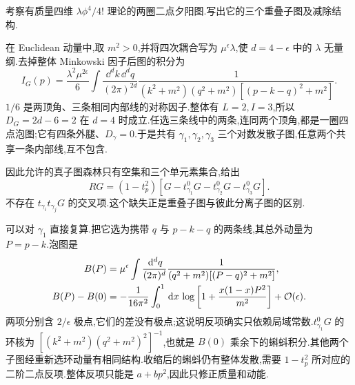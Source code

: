 \begin{example}
考察有质量四维 $\lambda\phi^4/4!$ 理论的两圈二点夕阳图.写出它的三个重叠子图及减除结构.
\end{example}
\begin{solution}
在 Euclidean 动量中,取 $m^2>0$,并将四次耦合写为 $\mu^\epsilon\lambda$,使 $d=4-\epsilon$ 中的 $\lambda$ 无量纲.去掉整体 Minkowski 因子后图的积分为
\begin{equation}
 I_G(p)=\frac{\lambda^2\mu^{2\epsilon}}{6}\int\frac{\dd^dk\,\dd^dq}{(2\pi)^{2d}}
 \frac1{(k^2+m^2)(q^2+m^2)[(p-k-q)^2+m^2]}.
 \label{eq:sunset-two-loop-integral}
\end{equation}
$1/6$ 是两顶角、三条相同内部线的对称因子.整体有 $L=2,I=3$,所以 $D_G=2d-6=2$ 在 $d=4$ 时成立.任选三条线中的两条,连同两个顶角,都是一圈四点泡图;它有四条外腿、$D_\gamma=0$.于是共有 $\gamma_1,\gamma_2,\gamma_3$ 三个对数发散子图,任意两个共享一条内部线,互不包含.

\begin{center}
\end{center}

因此允许的真子图森林只有空集和三个单元素集合,给出
\begin{equation}
 RG=(1-t_p^2)\left[G-t_{\gamma_1}^0G
                       -t_{\gamma_2}^0G-t_{\gamma_3}^0G\right].
 \label{eq:sunset-forest}
\end{equation}
不存在 $t_{\gamma_i}t_{\gamma_j}G$ 的交叉项.这个缺失正是重叠子图与彼此分离子图的区别.

可以对 $\gamma_1$ 直接复算.把它选为携带 $q$ 与 $p-k-q$ 的两条线,其总外动量为 $P=p-k$.泡图是
\begin{align}
 B(P)&=\mu^\epsilon\int\frac{\,\mathrm d^dq}{(2\pi)^d}
       \frac1{(q^2+m^2)[(P-q)^2+m^2]},\notag\\
 B(P)-B(0)&=-\frac1{16\pi^2}\int_0^1\,\mathrm d x\,
       \log\left[1+\frac{x(1-x)P^2}{m^2}\right]+\mathcal O(\epsilon).
 \label{eq:sunset-bubble-subtraction}
\end{align}
两项分别含 $2/\epsilon$ 极点,它们的差没有极点;这说明反项确实只依赖局域常数.$t_{\gamma_1}^0G$ 的环核为
$[(k^2+m^2)(q^2+m^2)^2]^{-1}$,也就是 $B(0)$ 乘余下的蝌蚪积分.其他两个子图经重新选环动量有相同结构.收缩后的蝌蚪仍有整体发散,需要 $1-t_p^2$ 所对应的二阶二点反项.整体反项只能是 $a+bp^2$,因此只修正质量和动能.


\end{solution}
